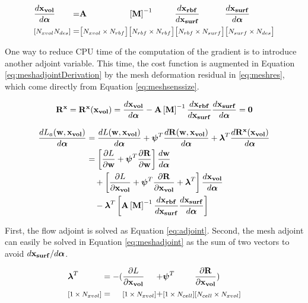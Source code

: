 \documentclass[letterpaper,12pt,]{article}
\begin{document}
\begin{equation}
\begin{alignedat}{6}
	&\Dt{\xvol}{\balfa}
	&&=
	&& \mbf{A}
	&& \inv{\mbf{M}}      
	&& \Dt{\xrbf}{\xsurf} 
	&& \Dt{\xsurf}{\balfa}
\\	                   
	&\smt{\left[\nxvol \ndes \right]}
	&&=
	&&\nxn{\nxvol}{\nrbf}
	&&\nxn{\nrbf}{\nrbf}
	&&\nxn{\nrbf}{N_{surf}}
	&&\nxn{N_{surf}}{\ndes}
\label{eq:meshsenssize}
\end{alignedat}
\end{equation}

One way to reduce CPU time of the computation of the gradient is to introduce another adjoint variable.
This time, the cost function is augmented in Equation \ref{eq:meshadjointDerivation} by the mesh deformation residual in \ref{eq:meshres}, which come directly from Equation \ref{eq:meshsenssize}.

\begin{equation}
	\bR^{\mbf{x}} 
	= \bR^{\mbf{x}}(\xvol) 
	= \Dt{\xvol}{\balfa} 
	- \mbf{A}
	\inv{\mbf{M}}
	\Dt{\xrbf}{\xsurf}
	\Dt{\xsurf}{\balfa}
	= \mbf{0}
	\label{eq:meshres}
\end{equation}

\begin{equation}
\begin{split}
	\Dt{L_a( \bw, \xvol )}{\balfa} &= 
	\Dt{L( \bw, \xvol )}{\balfa} 
	+
	\bpsi^T
	\Dt{\bR( \bw, \xvol )}{\balfa}
	+
	\blam^T
	\Dt{\bR^{\mbf{x}}(\xvol)}{\balfa}
\\
	&=
	\sqbr{
		\del{L}{\bw}
		+
		\bpsi^T
		\del{\bR}{\bw}
	}
	\Dt{\bw}{\balfa}
	\\
	&\quad+
	\sqbr{
		\del{L}{\xvol}
		+
		\bpsi^T
		\del{\bR}{\xvol}
		+
		\blam^T
	}
	\Dt{\xvol}{\balfa}
	\\
	&\quad-
	\blam^T
	\sqbr{
		\mbf{A}
		\inv{\mbf{M}}
		\Dt{\xrbf}{\xsurf}
		\Dt{\xsurf}{\balfa}
	}
	\label{eq:meshadjointDerivation}
\end{split}
\end{equation}

First, the flow adjoint is solved as Equation \ref{eq:adjoint}.
Second, the mesh adjoint can easily be solved in Equation \ref{eq:meshadjoint} as the sum of two vectors to avoid $d\mathbf{x_{surf}}/d\boldsymbol{\alpha}$.

\begin{equation}
\begin{alignedat}{6}
	&\blam^T 
	&&= 
	-(&&\del{L}{\xvol}
	&&+
	&&\bpsi^T
	&&\del{\bR}{\xvol})
\\	                   
	&\smt{\left[1 \times \nxvol \right]}
	&&=
	&&\nxn{1}{\nxvol}
	&&+
	&&\nxn{1}{\ncell}
	&&\nxn{\ncell}{\nxvol}
\label{eq:meshadjoint}
\end{alignedat}
\end{equation}
\end{document}
